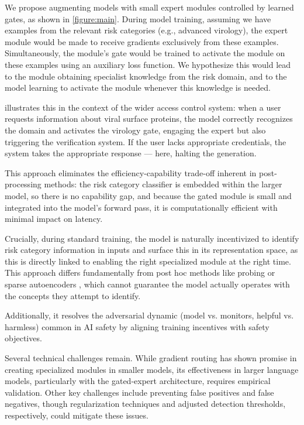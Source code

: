 \documentclass{article}
\theoremstyle{plain}
\theoremstyle{definition}
\theoremstyle{remark}
\begin{document}
We propose augmenting models with small expert modules controlled by
learned gates, as shown in \cref{figure:main}.
During model training, assuming we have examples from the relevant
risk categories (e.g., advanced virology), the expert module would be
made to receive gradients exclusively from these examples.
Simultaneously, the module's gate would be trained to activate the
module on these examples using an auxiliary loss function.
We hypothesize this would lead to the module obtaining specialist
knowledge from the risk domain, and to the model learning to activate
the module whenever this knowledge is needed.

 illustrates this in the context of the wider
access control system: when a user requests information about viral
surface proteins, the model correctly recognizes the domain and
activates the virology gate, engaging the expert but also triggering
the verification system. If the user lacks appropriate credentials,
the system takes the appropriate response --- here, halting the generation.

This approach eliminates the efficiency-capability
trade-off inherent in post-processing methods: the risk category
classifier is embedded within the larger model, so there is no
capability gap, and because the gated module is small and integrated
into the model's forward pass, it is computationally efficient with
minimal impact on latency.

Crucially, during standard training, the model is naturally incentivized to identify risk category information in inputs and surface this in its representation space, as this is directly linked to enabling the right specialized module at the right time.
This approach differs fundamentally from post hoc methods like probing or sparse autoencoders \cite{cunningham2023sparseautoencodershighlyinterpretable}, which cannot guarantee the model actually operates with the concepts they attempt to identify.

Additionally, it resolves the adversarial dynamic (model vs. monitors, helpful vs. harmless) common in AI safety by aligning training incentives with safety objectives.

Several technical challenges remain.
While gradient routing has shown promise in creating specialized modules in smaller models, its effectiveness in larger language models, particularly with the gated-expert architecture, requires empirical validation.
Other key challenges include preventing false positives and false negatives, though regularization techniques and adjusted detection thresholds, respectively, could mitigate these issues.
\end{document}
